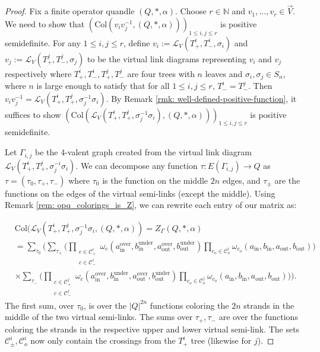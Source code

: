 \documentclass[10pt,a4paper]{amsart}
\begin{document}
\begin{proof}
    Fix a finite operator quandle $(Q,*,\alpha)$. Choose $r\in \mathbb{N}$ and $v_1,...,v_r \in \vec{V}$. We need to show that $(\text{Col}(v_iv_j^{-1}, (Q,*,\alpha)))_{1\leq i,j \leq r}$ is positive semidefinite. For any $1\leq i,j\leq r$, define $v_i:=\mathscr{L}_{V}(T_+^i,T_-^i, \sigma_i)$ and $v_j:=\mathscr{L}_{V}(T_+^j, T_-^j, \sigma_j)$ to be the virtual link diagrams representing $v_i$ and $v_j$ respectively where $T_+^i, T_-^i, T_+^j, T_-^j$ are four trees with $n$ leaves and $\sigma_i, \sigma_j \in S_n$, where $n$ is large enough to satisfy that for all $1\leq i,j \leq r$, $T_-^i=T_-^j$. Then $v_iv_j^{-1}=\mathscr{L}_{V}(T_+^i, T_+^j, \sigma_j^{-1} \sigma_i)$. By Remark \ref{rmk: well-defined-positive-function}, it suffices to show $\left(\text{Col}(\mathscr{L}_{V}(T_+^i, T_+^j, \sigma_j^{-1}\sigma_i), (Q,*,\alpha))\right)_{1\leq i,j\leq r}$ is positive semidefinite. 

    Let $\Gamma_{i,j}$ be the 4-valent graph created from the virtual link diagram $\mathscr{L}_{V}(T_+^i, T_+^j, \sigma_j^{-i}\sigma_i)$. We can decompose any function $\tau:E(\Gamma_{i,j})\to Q$ as $\tau=(\tau_0, \tau_+, \tau_-)$ where $\tau_0$ is the function on the middle $2n$ edges, and $\tau_\pm$ are the functions on the edges of the virtual semi-links (except the middle). Using Remark \ref{rem: opq_colorings_is_Z}, we can rewrite each entry of our matrix as:

    \begin{align*}
        &\text{Col}(\mathscr{L}_{V}(T_+^i,T_+^j, \sigma_j^{-1}\sigma_i, (Q,*,\alpha))=Z_\Gamma(Q,*,\alpha)\\
        &= \sum_{\tau_0} \Biggl(\sum_{\tau_+}\Biggl(\prod_{\substack{c \in \mathcal{C}_+^i\\ c\in \mathcal{C}_-^i} }\omega_{c} (a_{\text{in}}^\text{over}, b_{\text{in}}^\text{under}, a_{\text{out}}^\text{over},b_{\text{out}}^\text{under})\prod_{c_\text{o}\in \mathcal{C}_\text{o}^i}\omega_{c_\text{o}}(a_\text{in}, b_\text{in}, a_\text{out}, b_\text{out})\Biggr)\\
        &\times \sum_{\tau_-}\Biggl(\prod_{\substack{c \in \mathcal{C}_+^j\\ c\in \mathcal{C}_-^j} }\omega_{c} (a_{\text{in}}^\text{over}, b_{\text{in}}^\text{under}, a_{\text{out}}^\text{over},b_{\text{out}}^\text{under})\prod_{c_\text{o}\in \mathcal{C}_\text{o}^j}\omega_{c_\text{o}}(a_\text{in}, b_\text{in}, a_\text{out}, b_\text{out})\Biggr)\Biggr).
    \end{align*}
    The first sum, over $\tau_0$, is over the $|Q|^{2n}$ functions coloring the $2n$ strands in the middle of the two virtual semi-links. The sums over $\tau_+, \tau_-$ are over the functions coloring the strands in the respective upper and lower virtual semi-link. The sets $\mathcal{C}_\pm^i, \mathcal{C}_o^i$ now only contain the crossings from the $T_+^i$ tree (likewise for $j$). 


\end{proof}
\end{document}
